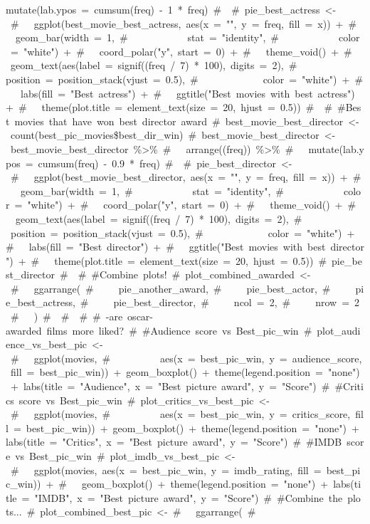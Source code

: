 \documentclass[]{article}
\begin{document}
{mutate(lab.ypos\ =\ cumsum(freq)\ -\ 1\ *\ freq)\ \#\ \ \#\ pie\_best\_actress\ \textless{}-\ \#\ \ \ ggplot(best\_movie\_best\_actress,\ aes(x\ =\ "",\ y\ =\ freq,\ fill\ =\ x))\ +\ \#\ \ \ geom\_bar(width\ =\ 1,\ \#\ \ \ \ \ \ \ \ \ \ \ \ stat\ =\ "identity",\ \#\ \ \ \ \ \ \ \ \ \ \ \ color\ =\ "white")\ +\ \#\ \ \ coord\_polar("y",\ start\ =\ 0)\ +\ \#\ \ \ theme\_void()\ +\ \#\ \ \ geom\_text(aes(label\ =\ signif((freq\ /\ 7)\ *\ 100),\ digits\ =\ 2),\ \#\ \ \ \ \ \ \ \ \ \ \ \ \ position\ =\ position\_stack(vjust\ =\ 0.5),\ \#\ \ \ \ \ \ \ \ \ \ \ \ \ color\ =\ "white")\ +\ \#\ \ \ labs(fill\ =\ "Best\ actress")\ +\ \#\ \ \ ggtitle("Best\ movies\ with\ best\ actress")\ +\ \#\ \ \ theme(plot.title\ =\ element\_text(size\ =\ 20,\ hjust\ =\ 0.5))\ \#\ \ \#\ \#Best\ movies\ that\ have\ won\ best\ director\ award\ \#\ best\_movie\_best\_director\ \textless{}-\ count(best\_pic\_movies\$best\_dir\_win)\ \#\ best\_movie\_best\_director\ \textless{}-\ best\_movie\_best\_director\ \%\textgreater{}\%\ \#\ \ \ arrange((freq))\ \%\textgreater{}\%\ \#\ \ \ mutate(lab.ypos\ =\ cumsum(freq)\ -\ 0.9\ *\ freq)\ \#\ \ \#\ pie\_best\_director\ \textless{}-\ \#\ \ \ ggplot(best\_movie\_best\_director,\ aes(x\ =\ "",\ y\ =\ freq,\ fill\ =\ x))\ +\ \#\ \ \ geom\_bar(width\ =\ 1,\ \#\ \ \ \ \ \ \ \ \ \ \ \ stat\ =\ "identity",\ \#\ \ \ \ \ \ \ \ \ \ \ \ color\ =\ "white")\ +\ \#\ \ \ coord\_polar("y",\ start\ =\ 0)\ +\ \#\ \ \ theme\_void()\ +\ \#\ \ \ geom\_text(aes(label\ =\ signif((freq\ /\ 7)\ *\ 100),\ digits\ =\ 2),\ \#\ \ \ \ \ \ \ \ \ \ \ \ \ position\ =\ position\_stack(vjust\ =\ 0.5),\ \#\ \ \ \ \ \ \ \ \ \ \ \ \ color\ =\ "white")\ +\ \#\ \ \ labs(fill\ =\ "Best\ director")\ +\ \#\ \ \ ggtitle("Best\ movies\ with\ best\ director")\ +\ \#\ \ \ theme(plot.title\ =\ element\_text(size\ =\ 20,\ hjust\ =\ 0.5))\ \#\ pie\_best\_director\ \#\ \ \#\ \#Combine\ plots!\ \#\ plot\_combined\_awarded\ \textless{}-\ \#\ \ \ ggarrange(\ \#\ \ \ \ \ pie\_another\_award,\ \#\ \ \ \ \ pie\_best\_actor,\ \#\ \ \ \ \ pie\_best\_actress,\ \#\ \ \ \ \ pie\_best\_director,\ \#\ \ \ \ \ ncol\ =\ 2,\ \#\ \ \ \ \ nrow\ =\ 2\ \#\ \ \ )\ \#\ \ \#\ \ \#\ \#\ -are\ oscar-awarded\ films\ more\ liked?\ \#\ \#Audience\ score\ vs\ Best\_pic\_win\ \#\ plot\_audience\_vs\_best\_pic\ \textless{}-\ \#\ \ \ ggplot(movies,\ \#\ \ \ \ \ \ \ \ \ \ aes(x\ =\ best\_pic\_win,\ y\ =\ audience\_score,\ fill\ =\ best\_pic\_win))\ +\ geom\_boxplot()\ +\ theme(legend.position\ =\ "none")\ +\ labs(title\ =\ "Audience",\ x\ =\ "Best\ picture\ award",\ y\ =\ "Score")\ \#\ \#Critics\ score\ vs\ Best\_pic\_win\ \#\ plot\_critics\_vs\_best\_pic\ \textless{}-\ \#\ \ \ ggplot(movies,\ \#\ \ \ \ \ \ \ \ \ \ aes(x\ =\ best\_pic\_win,\ y\ =\ critics\_score,\ fill\ =\ best\_pic\_win))\ +\ geom\_boxplot()\ +\ theme(legend.position\ =\ "none")\ +\ labs(title\ =\ "Critics",\ x\ =\ "Best\ picture\ award",\ y\ =\ "Score")\ \#\ \#IMDB\ score\ vs\ Best\_pic\_win\ \#\ plot\_imdb\_vs\_best\_pic\ \textless{}-\ \#\ \ \ ggplot(movies,\ aes(x\ =\ best\_pic\_win,\ y\ =\ imdb\_rating,\ fill\ =\ best\_pic\_win))\ +\ \#\ \ \ geom\_boxplot()\ +\ theme(legend.position\ =\ "none")\ +\ labs(title\ =\ "IMDB",\ x\ =\ "Best\ picture\ award",\ y\ =\ "Score")\ \#\ \#Combine\ the\ plots...\ \#\ plot\_combined\_best\_pic\ \textless{}-\ \#\ \ \ ggarrange(\ \#\ \ \ \ \ }
\end{document}
